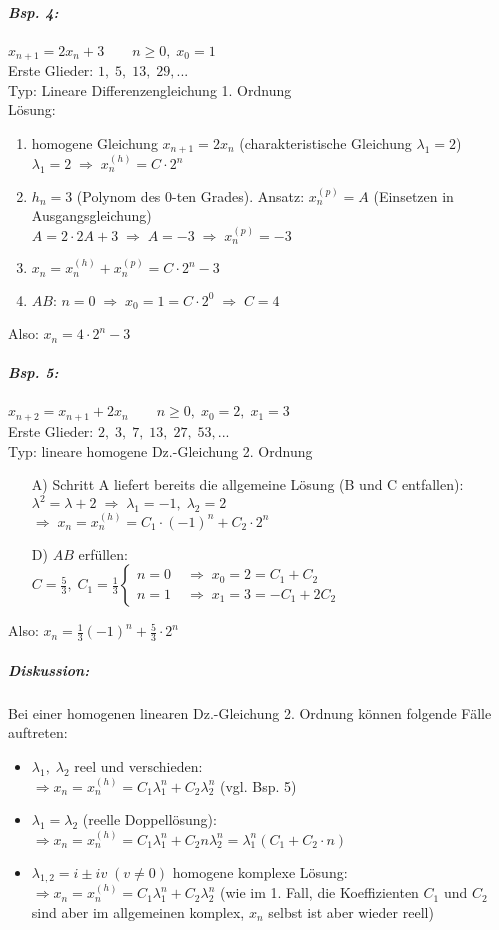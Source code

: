 \subparagraph{Bsp. 4:} $x_{n+1}=2 x_n +3 \qquad n\geq 0, \; x_0 =1$\\
Erste Glieder: $1,\; 5,\; 13,\; 29, ...$\\
Typ: Lineare Differenzengleichung 1. Ordnung\\
Lösung:
\begin{enumerate}[label=\Alph*)]
\item homogene Gleichung $x_{n+1}=2x_n$ (charakteristische Gleichung $\lambda_1 =2$)\\
$\lambda_1 =2 \; \Rightarrow \; x_n^{(h)}=C\cdot 2^n$
\item $h_n=3$ (Polynom des $0$-ten Grades). Ansatz: $x_n^{(p)}=A$ (Einsetzen in Ausgangsgleichung)\\
$A=2\cdot 2A+3 \; \Rightarrow \; A=-3 \;\Rightarrow\; x_n^{(p)}=-3$
\item $x_n = x_n^{(h)}+x_n^{(p)}=C\cdot 2^n-3$
\item $AB$: $n=0 \; \Rightarrow \; x_0 = 1 = C \cdot 2^0 \; \Rightarrow \; C=4$
\end{enumerate}
Also: $x_n=4 \cdot 2^n -3$
\subparagraph{Bsp. 5:} $x_{n+2}=x_{n+1}+2x_n \qquad n\geq 0, \; x_0 =2, \;x_1=3$\\
Erste Glieder: $2,\; 3, \; 7, \; 13,\; 27,\; 53, ...$\\
Typ: lineare homogene Dz.-Gleichung 2. Ordnung
\begin{enumerate}
\item[A)] Schritt A liefert bereits die allgemeine Lösung (B und C entfallen):
$\lambda^2=\lambda+2 \;\Rightarrow\; \lambda_1 = -1, \; \lambda_2 =2$\\
$\Rightarrow\; x_n=x_n^{(h)}=C_1 \cdot (-1)^n + C_2\cdot 2^n$
\item[D)] $AB$ erfüllen:\\
$C=\frac{5}{3},  \; C_1=\frac{1}{3} \begin{cases}
n=0 \; &\Rightarrow \; x_0 =2 = C_1+C_2\\
n=1 \; &\Rightarrow \; x_1 =3 = -C_1+2C_2
\end{cases}$
\end{enumerate}
Also: $x_n=\frac{1}{3}(-1)^n+\frac{5}{3}\cdot 2^n$
\subparagraph{Diskussion:} Bei einer homogenen linearen Dz.-Gleichung 2. Ordnung können folgende Fälle auftreten:
\begin{itemize}
\item $\lambda_1, \; \lambda_2$ reel und verschieden:\\
$\Rightarrow x_n = x_n^{(h)}= C_1 \lambda_1^n+C_2 \lambda_2^n$ (vgl. Bsp. 5)
\item $\lambda_1 = \lambda_2$ (reelle Doppellösung):\\
$\Rightarrow x_n = x_n^{(h)}= C_1 \lambda_1^n+C_2 n \lambda_2^n = \lambda_1^n(C_1+C_2\cdot n)$
\item $\lambda_{1,2} = i \pm iv \; (v \not = 0)$ homogene komplexe Lösung:\\
$\Rightarrow x_n = x_n^{(h)}= C_1 \lambda_1^n+C_2 \lambda_2^n$ (wie im 1. Fall, die Koeffizienten $C_1$ und $C_2$ sind aber im allgemeinen komplex, $x_n$ selbst ist aber wieder reell)
\end{itemize}

